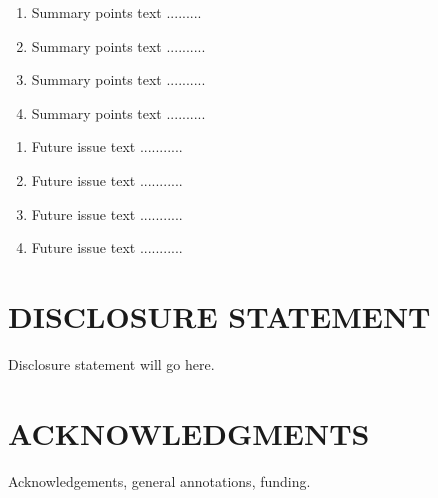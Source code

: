 \documentclass{ar-1col}
\begin{document}
\begin{summary}
\begin{enumerate}
\item Summary points text .........
\item Summary points text ..........
\item Summary points text ..........
\item Summary points text ..........
\end{enumerate}
\end{summary}

\begin{issues}
\begin{enumerate}
\item Future issue text ...........
\item Future issue text ...........
\item Future issue text ...........
\item Future issue text ...........
\end{enumerate}
\end{issues}

\section*{DISCLOSURE STATEMENT}
Disclosure statement will go here.

\section*{ACKNOWLEDGMENTS}
Acknowledgements, general annotations, funding.

%
%


\end{document}
